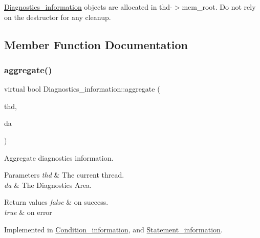 \mbox{\hyperlink{classDiagnostics__information}{Diagnostics\+\_\+information}} objects are allocated in thd-\/$>$mem\+\_\+root. Do not rely on the destructor for any cleanup. 

\subsection{Member Function Documentation}
\mbox{\label{classDiagnostics__information_a5181f11d3ef8554e1989a882bc2504dc}} 
\subsubsection{\texorpdfstring{aggregate()}{aggregate()}}
{\footnotesize\ttfamily virtual bool Diagnostics\+\_\+information\+::aggregate (\begin{DoxyParamCaption}\item[{T\+HD $\ast$}]{thd,  }\item[{const \mbox{\hyperlink{classDiagnostics__area}{Diagnostics\+\_\+area}} $\ast$}]{da }\end{DoxyParamCaption})\hspace{0.3cm}{\ttfamily [pure virtual]}}

Aggregate diagnostics information.


\begin{DoxyParams}{Parameters}
{\em thd} & The current thread. \\
\hline
{\em da} & The Diagnostics Area.\\
\hline
\end{DoxyParams}

\begin{DoxyRetVals}{Return values}
{\em false} & on success. \\
\hline
{\em true} & on error \\
\hline
\end{DoxyRetVals}


Implemented in \mbox{\hyperlink{classCondition__information_acb021776f86470bf0ca0da8a3f60c44a}{Condition\+\_\+information}}, and \mbox{\hyperlink{classStatement__information_ab059a9e174ffce90b78d541ec4f93455}{Statement\+\_\+information}}.

\mbox{\label{classDiagnostics__information_a76edbb6f3462e7e236d71496c8b09094}} 
